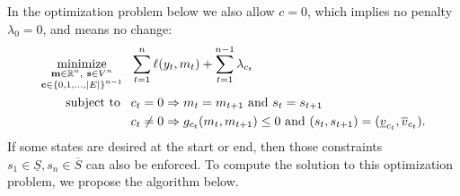\documentclass{article}
\DeclareMathOperator*{\minimize}{minimize}
\newcommand{\RR}{\mathbb R}
\begin{document}
In the optimization problem below we
also allow $c=0$, which implies no penalty $\lambda_0=0$, and means no
change:
\begin{align}
  \label{eq:GFPOP_problem}
  \minimize_{
    \substack{
    \mathbf m\in\RR^n,\ \mathbf s\in V^n\\
\mathbf c\in \{0,1,\dots,|E|\}^{n-1}
}
    } &\ \ 
  \sum_{t=1}^n \ell(y_t, m_t) + \sum_{t=1}^{n-1} \lambda_{c_t} \\
  \text{subject to\,} &\ \ c_t = 0 \Rightarrow m_t = m_{t+1}
\text{ and } s_t= s_{t+1}
  \nonumber\\
&\ \ c_t \neq 0 \Rightarrow g_{c_t}(m_t, m_{t+1})\leq 0\text{ and }
(s_t,s_{t+1})=(\underline v_{c_t}, \overline v_{c_t}).
\nonumber
\end{align}
If some states are desired at the start or end, then those constraints
$s_1\in \underline S, s_n\in\overline S$ can also be enforced. To
compute the solution to this optimization problem, we propose the
algorithm below.
\end{document}
